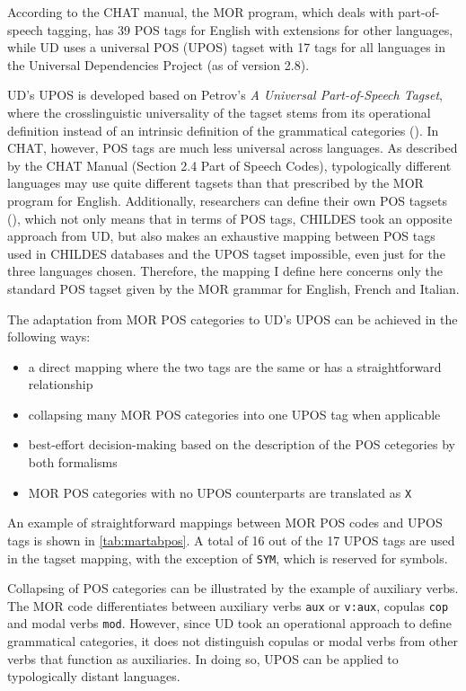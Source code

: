 According to the CHAT manual, the MOR program, which deals with part-of-speech tagging, has 39 POS tags for English with extensions for other languages, while UD uses a universal POS (UPOS) tagset with 17 tags for all languages in the Universal Dependencies Project (as of version 2.8).

UD's UPOS is developed based on Petrov's \emph{A Universal Part-of-Speech Tagset}, where the crosslinguistic universality of the tagset stems from its operational definition instead of an intrinsic definition of the grammatical categories (\cite{petrov2012}). In CHAT, however, POS tags are much less universal across languages. As described by the CHAT Manual (Section 2.4 Part of Speech Codes), typologically different languages may use quite different tagsets than that prescribed by the MOR program for English. Additionally, researchers can define their own POS tagsets (\cite{Macwhinney2000}), which not only means that in terms of POS tags, CHILDES took an opposite approach from UD, but also makes an exhaustive mapping between POS tags used in CHILDES databases and the UPOS tagset impossible, even just for the three languages chosen. Therefore, the mapping I define here concerns only the standard POS tagset given by the MOR grammar for English, French and Italian.

The adaptation from MOR POS categories to UD's UPOS can be achieved in the following ways:
\begin{itemize}
	\item a direct mapping where the two tags are the same or has a straightforward relationship
	\item collapsing many MOR POS categories into one UPOS tag when applicable
	\item best-effort decision-making based on the description of the POS cetegories by both formalisms
	\item MOR POS categories with no UPOS counterparts are translated as \texttt{X}
\end{itemize}

An example of straightforward mappings between MOR POS codes and UPOS tags is shown in \ref{tab:martabpos}. A total of 16 out of the 17 UPOS tags are used in the tagset mapping, with the exception of \texttt{SYM}, which is reserved for symbols.

Collapsing of POS categories can be illustrated by the example of auxiliary verbs. The MOR code differentiates between auxiliary verbs \texttt{aux} or \texttt{v:aux}, copulas \texttt{cop} and modal verbs \texttt{mod}. However, since UD took an operational approach to define grammatical categories, it does not distinguish copulas or modal verbs from other verbs that function as auxiliaries.  In doing so, UPOS can be applied to typologically distant languages.

